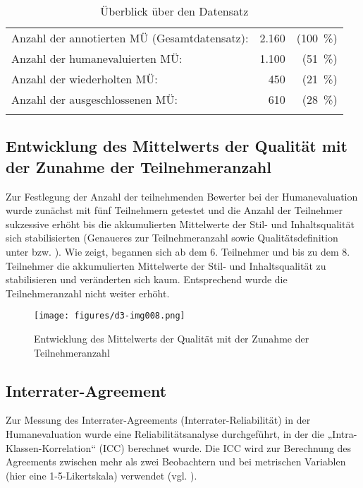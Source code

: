 \begin{table}
\begin{tabularx}{\textwidth}{Xrr}
\lsptoprule
Anzahl der annotierten MÜ (Gesamtdatensatz): & 2.160 & (100~\%)\\
Anzahl der humanevaluierten MÜ: & 1.100 & (51~\%)\\
Anzahl der wiederholten MÜ: & 450 & (21~\%)\\
Anzahl der ausgeschlossenen MÜ: & 610 & (28~\%)\\
\lspbottomrule
\end{tabularx}
\caption{\label{tab:05:11} Überblick über den Datensatz   }
\end{table}

\subsection{Entwicklung des Mittelwerts der Qualität mit der Zunahme der Teilnehmeranzahl}
\label{sec:5.1.1}
Zur Festlegung der Anzahl der teilnehmenden Bewerter bei der Humanevaluation wurde zunächst mit fünf Teilnehmern getestet und die Anzahl der Teilnehmer sukzessive erhöht bis die akkumulierten Mittelwerte der Stil- und Inhaltsqualität sich stabilisierten (Genaueres zur Teilnehmeranzahl sowie Qualitätsdefinition unter  bzw. ). Wie  zeigt, begannen sich ab dem 6. Teilnehmer und bis zu dem 8. Teilnehmer die akkumulierten Mittelwerte der Stil- und Inhaltsqualität zu stabilisieren und veränderten sich kaum. Entsprechend wurde die Teilnehmeranzahl nicht weiter erhöht.


\begin{figure}
\texttt{[image: figures/d3-img008.png]}
\caption{\label{fig:05:10} Entwicklung des Mittelwerts der Qualität mit der Zunahme der Teilnehmeranzahl}
\end{figure}

\subsection{Interrater-Agreement}
\label{sec:5.1.2}
Zur Messung des Interrater-Agreements (Interrater-Reliabilität) in der Humanevaluation wurde eine Reliabilitätsanalyse durchgeführt, in der die „Intra-Klassen-Korrelation“ (ICC) berechnet wurde. Die ICC wird zur Berechnung des Agreements zwischen mehr als zwei Beobachtern und bei metrischen Variablen (hier eine 1-5-Likertskala) verwendet (vgl. \citealt{LandisKoch1977}).


